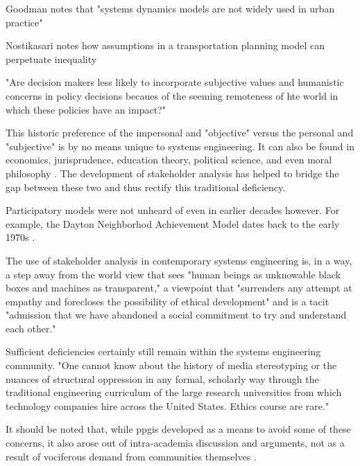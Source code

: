 Goodman notes that "systems dynamics models are not widely used in urban practice" \cite{goodspeedScenarioPlanningCities2020}

Nostikasari notes how assumptions in a transportation planning model can perpetuate inequality \cite{nostikasariRepresentationsEverydayTravel2015}

"Are decision makers less likely to incorporate subjective values and humanistic concerns in policy decisions becaues of the seeming remoteness of hte world in which these policies have an impact?" \cite{vereginComputerInnovationAdoption1994}

This historic preference of the impersonal and "objective" versus the personal and "subjective" is by no means unique to systems engineering. It can also be found in economics, jurisprudence, education theory, political science, and even moral philosophy \cite{banuriModernatizationItsDiscontents1990}. The development of stakeholder analysis has helped to bridge the gap between these two and thus rectify this traditional deficiency. 

Participatory models were not unheard of even in earlier decades however. For example, the Dayton Neighborhod Achievement Model dates back to the early 1970s \cite{lightWarfareWelfareDefense2005}.

The use of stakeholder analysis in contemporary systems engineering is, in a way, a step away from the world view that sees "human beings as unknowable black boxes and machines as transparent," a viewpoint that "surrenders any attempt at empathy and forecloses the possibility of ethical development" and is a tacit "admission that we have abandoned a social commitment to try and understand each other." \cite{eubanksAutomatingInequalityHow2018}

Sufficient deficiencies certainly still remain within the systems engineering community. "One cannot know about the history of media stereotyping or the nuances of structural oppression in any formal, scholarly way through the traditional engineering curriculum of the large research universities from which technology companies hire across the United States. Ethics course are rare." \cite{nobleAlgorithmsOppressionHow2018}

It should be noted that, while \ac{ppgis} developed as a means to avoid some of these concerns, it also arose out of intra-academia discussion and arguments, not as a result of vociferous demand from communities themselves \cite{weinerParticipatoryGeographicInformation2007}. 

